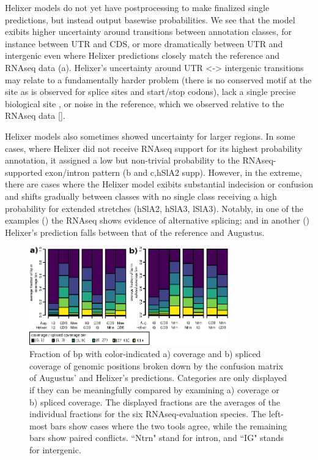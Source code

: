 \documentclass{bioinfo}
\begin{document}
Helixer models do not yet have postprocessing
to make finalized single predictions, but instead output basewise probabilities.
We see that the model exibits higher uncertainty around transitions between annotation 
classes, for instance between UTR and CDS, or more dramatically between UTR and 
intergenic even where Helixer predictions closely match the reference and RNAseq data (a). 
Helixer's uncertainty around UTR <-> intergenic transitions may relate to a
fundamentally harder problem (there is no conserved motif at the site as is observed
for splice sites and start/stop codons), lack a single precise biological site \citep{},
or noise in the reference, which we observed relative to the RNAseq data \ref{}. %

Helixer models also sometimes showed uncertainty for larger regions.
In some cases, where Helixer did not receive RNAseq support for its highest probability
annotation, it assigned a low but non-trivial probability to the RNAseq-supported 
exon/intron pattern (b and c,hSlA2 supp). However, in the extreme,
there are cases where the Helixer model exibits substantial indecision or confusion 
and shifts gradually between classes with no single class receiving a high probability 
for extended stretches (hSlA2, hSlA3, lSlA3). Notably, in one of the examples ()
the RNAseq shows evidence of alternative splicing; and in another () Helixer's
prediction falls between that of the reference and Augustus.

\begin{figure}[!h]
\label{fig:average_vs_augustus}
\includegraphics[width=8.6cm]{images/cov_examples/average_vs_augustus}  %
\caption{Fraction of bp with color-indicated a) coverage and b) spliced coverage of genomic positions 
broken down by the confusion matrix of Augustus' and Helixer's predictions. Categories 
are only displayed if they can be meaningfully compared by examining a) coverage or b) spliced
coverage. The displayed fractions are the averages of the individual fractions for the 
six RNAseq-evaluation species. The left-most bars show cases where the two tools agree, 
while the remaining bars show paired conflicts. ``Ntrn" stand
for intron, and ``IG" stands for intergenic.}
\end{figure}
\end{document}
